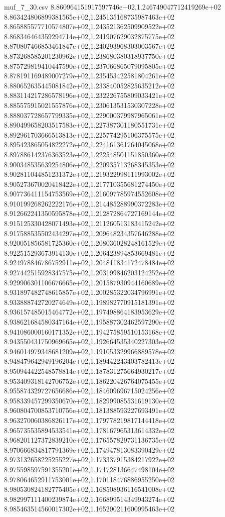 \begin{filecontents*}{muf_7_30.csv}
8.860964151917597746e+02,1.246749047712419269e+02
8.863424806899381565e+02,1.245135168735987463e+02
8.865885577710574807e+02,1.243521362509909522e+02
8.868346464359294714e+02,1.241907629032875775e+02
8.870807466853461847e+02,1.240293968303003567e+02
8.873268585201230962e+02,1.238680380318937750e+02
8.875729819410447590e+02,1.237066865079095805e+02
8.878191169489007279e+02,1.235453422581804261e+02
8.880652635445081842e+02,1.233840052825635212e+02
8.883114217286578196e+02,1.232226755809033421e+02
8.885575915021557876e+02,1.230613531530307228e+02
8.888037728657799335e+02,1.229000379987965061e+02
8.890499658203517583e+02,1.227387301180551731e+02
8.892961703666513813e+02,1.225774295106375575e+02
8.895423865054822272e+02,1.224161361764045068e+02
8.897886142376363523e+02,1.222548501151850360e+02
8.900348535639254806e+02,1.220935713268345353e+02
8.902811044851231372e+02,1.219322998111993002e+02
8.905273670020418422e+02,1.217710355681274450e+02
8.907736411154753569e+02,1.216097785974552608e+02
8.910199268262222176e+02,1.214485288990372283e+02
8.912662241350595878e+02,1.212872864727169144e+02
8.915125330428071493e+02,1.211260513183415242e+02
8.917588535502434297e+02,1.209648234357646288e+02
8.920051856581725360e+02,1.208036028248161529e+02
8.922515293673914130e+02,1.206423894853669481e+02
8.924978846786752911e+02,1.204811834172478484e+02
8.927442515928347575e+02,1.203199846203124252e+02
8.929906301106676665e+02,1.201587930944160689e+02
8.931897482748615857e+02,1.200285322034796991e+02
8.933888742720274649e+02,1.198982770915181391e+02
8.936157485015464772e+02,1.197498864183953629e+02
8.938621684580347164e+02,1.195887302462597290e+02
8.941086000160171352e+02,1.194275859510153168e+02
8.943550431750969665e+02,1.192664535340227303e+02
8.946014979348681209e+02,1.191053329966889578e+02
8.948479642949196204e+02,1.189442243403782413e+02
8.950944422548578814e+02,1.187831275664930217e+02
8.953409318142706752e+02,1.186220426764075455e+02
8.955874329727656686e+02,1.184609696715024256e+02
8.958339457299350670e+02,1.182999085531619130e+02
8.960804700853710756e+02,1.181388593227693491e+02
8.963270060386826117e+02,1.179778219817144418e+02
8.965735535894533541e+02,1.178167965313614332e+02
8.968201127372839210e+02,1.176557829731136735e+02
8.970666834817791369e+02,1.174947813083390429e+02
8.973132658225255227e+02,1.173337915384217922e+02
8.975598597591355201e+02,1.171728136647498104e+02
8.978064652911753001e+02,1.170118476886955250e+02
8.980530824182775405e+02,1.168508936116541008e+02
8.982997111400239874e+02,1.166899514349943274e+02
8.985463514560017302e+02,1.165290211600995463e+02

\end{filecontents*}
